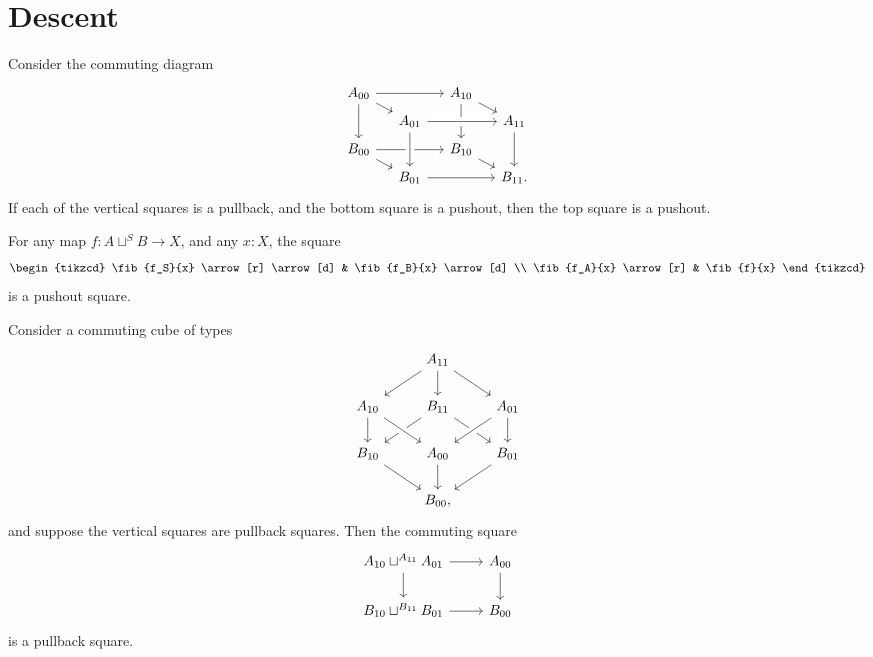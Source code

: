 \chapter{Descent}\label{chap:descent}

\begin{thm}
Consider the commuting diagram
\begin{equation*}
\begin{tikzcd}[column sep=small,row sep=tiny]
A_{00} \arrow[rr] \arrow[dr] \arrow[dd] & & A_{10} \arrow[dd] \arrow[dr] \\
& A_{01} \arrow[rr,crossing over] & & A_{11} \arrow[dd] \\
B_{00} \arrow[rr] \arrow[dr] & & B_{10} \arrow[dr] \\
& B_{01} \arrow[from=uu,crossing over] \arrow[rr] & & B_{11}.
\end{tikzcd}
\end{equation*}
If each of the vertical squares is a pullback, and the bottom square  is a pushout, then the top square is a pushout.
\end{thm}

\begin{cor}
For any map $f:A\sqcup^S B\to X$, and any $x:X$, the square
\begin{equation*}
\begin{tikzcd}
\fib{f_S}{x} \arrow[r] \arrow[d] & \fib{f_B}{x} \arrow[d] \\
\fib{f_A}{x} \arrow[r] & \fib{f}{x}
\end{tikzcd}
\end{equation*}
is a pushout square.
\end{cor}

\begin{thm}
Consider a commuting cube of types 
\begin{equation}\label{eq:cube}
\begin{tikzcd}
& A_{11} \arrow[dl] \arrow[dr] \arrow[d] \\
A_{10} \arrow[d] & B_{11} \arrow[dl] \arrow[dr] & A_{01} \arrow[dl,crossing over] \arrow[d] \\
B_{10} \arrow[dr] & A_{00} \arrow[d] \arrow[from=ul,crossing over] & B_{01} \arrow[dl] \\
& B_{00},
\end{tikzcd}
\end{equation}
and suppose the vertical squares are pullback squares. Then the commuting square
\begin{equation*}
\begin{tikzcd}
A_{10}\sqcup^{A_{11}} A_{01} \arrow[r] \arrow[d] & A_{00} \arrow[d] \\
B_{10}\sqcup^{B_{11}} B_{01} \arrow[r] & B_{00}
\end{tikzcd}
\end{equation*}
is a pullback square.
\end{thm}

